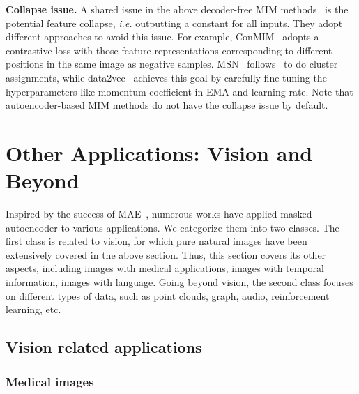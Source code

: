 \documentclass[10pt,journal,compsoc]{IEEEtran}
\begin{document}
\textbf{Collapse issue.} A shared issue in the above decoder-free MIM methods~\cite{yi2022masked,assran2022masked,baevski2022data2vec} is the potential feature collapse, \textit{i.e.} outputting a constant for all inputs. They adopt different approaches to avoid this issue. For example, ConMIM~\cite{yi2022masked} adopts a contrastive loss with those feature representations corresponding to different positions in the same image as negative samples. MSN~\cite{assran2022masked} follows~\cite{caron2020unsupervised} to do cluster assignments, while data2vec~\cite{baevski2022data2vec} achieves this goal by carefully fine-tuning the hyperparameters like momentum coefficient in EMA and learning rate. Note that autoencoder-based MIM methods do not have the collapse issue by default. 

\section{Other Applications: Vision and Beyond} \label{sec:to_others}

Inspired by the success of MAE~\cite{he2022masked}, numerous works have applied masked autoencoder to various applications. We categorize them into two classes. The first class is related to vision, for which pure natural images have been extensively covered in the above section. Thus, this section covers its other aspects, including images with medical applications, images with temporal information, images with language. Going beyond vision, the second class focuses on different types of data, such as point clouds, graph, audio, reinforcement learning, etc.




\subsection{Vision related applications}


\subsubsection{Medical images}
\end{document}

